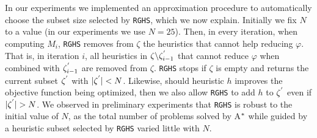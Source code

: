 In our experiments we implemented an approximation procedure to automatically choose the subset size selected by \texttt{RGHS}, which we now explain. Initially we fix $N$ to a value (in our experiments we use $N = 25$). Then, in every iteration, when computing $M_{i}$, \texttt{RGHS} removes from $\zeta$ the heuristics that cannot help reducing $\varphi$. That is, in iteration $i$, all heuristics in $\zeta \backslash \zeta_{i-1}\sp{'}$ that cannot reduce $\varphi$ when combined with $\zeta_{i-1}\sp{'}$ are removed from $\zeta$. \texttt{RGHS} stops if $\zeta$ is empty and returns the current subset $\zeta\sp{'}$ with $|\zeta\sp{'}|<N$. Likewise, should heuristic $h$ improves the objective function being optimized, then we also allow \texttt{RGHS} to add $h$ to $\zeta\sp{'}$ even if $|\zeta\sp{'}| > N$. We observed in preliminary experiments that \texttt{RGHS} is robust to the initial value of $N$, as the total number of problems solved by A$\sp{*}$ while guided by a heuristic subset selected by \texttt{RGHS} varied little with $N$.\\

